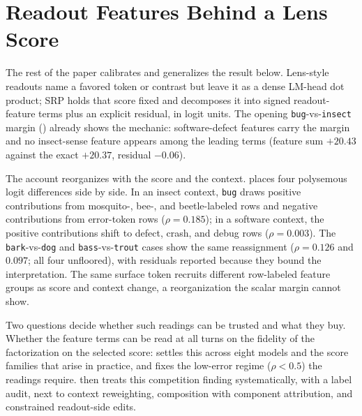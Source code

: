 \section{Readout Features Behind a Lens Score}
\label{sec:worked-example}

The rest of the paper calibrates and generalizes the result below.
Lens-style readouts name a favored token or contrast but leave it as a dense
LM-head dot product; SRP holds that score fixed and decomposes it into signed
readout-feature terms plus an explicit residual, in logit units. The opening
\texttt{bug}-vs-\texttt{insect} margin ()
already shows the mechanic: software-defect features carry the margin and no
insect-sense feature appears among the leading terms (feature sum \(+20.43\)
against the exact \(+20.37\), residual \(-0.06\)).

The account reorganizes with the score and the context.
 places four polysemous logit
differences side by side. In an insect context, \texttt{bug} draws positive
contributions from mosquito-, bee-, and beetle-labeled rows and negative
contributions from error-token rows (\(\rho=0.185\)); in a software context,
the positive contributions shift to defect, crash, and debug rows
(\(\rho=0.003\)). The \texttt{bark}-vs-\texttt{dog} and
\texttt{bass}-vs-\texttt{trout} cases show the same reassignment
(\(\rho=0.126\) and \(0.097\); all four unfloored), with residuals reported
because they bound the interpretation. The same surface token recruits different
row-labeled feature groups as score and context change, a reorganization
the scalar margin cannot show.

Two questions decide whether such readings can be trusted and what they buy.
Whether the feature terms can be read at all turns on the fidelity of the
factorization on the selected score:  settles this across
eight models and the score families that arise in practice, and fixes the
low-error regime (\(\rho<0.5\)) the readings require.
 then treats this competition finding
systematically, with a label audit, next to context reweighting, composition
with component attribution, and constrained readout-side edits.
